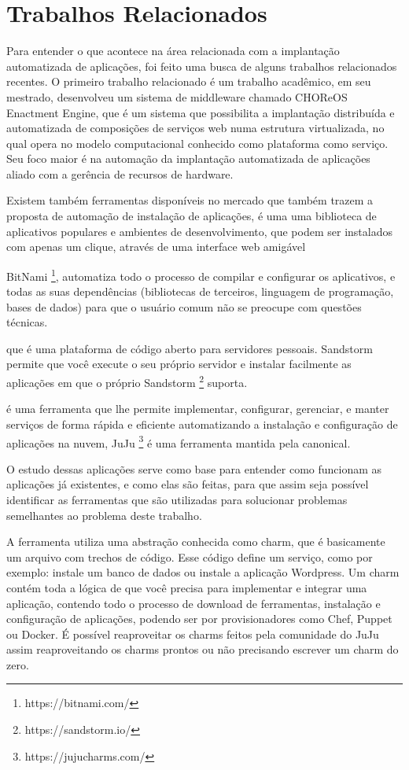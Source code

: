 \section{Trabalhos Relacionados}
\label{section:trabalhos_relacionados}

Para entender o que acontece na área relacionada com a implantação
automatizada de aplicações, foi feito uma busca de alguns trabalhos relacionados recentes. 
O primeiro
trabalho relacionado é um trabalho acadêmico,  em seu mestrado,
desenvolveu um sistema de middleware chamado CHOReOS Enactment Engine, que é um
sistema que possibilita a implantação distribuída e automatizada de composições
de serviços web numa estrutura virtualizada, no qual opera no modelo
computacional conhecido como plataforma como serviço. Seu foco maior é na automação da 
implantação automatizada de aplicações aliado com a gerência de recursos de 
hardware.

Existem também ferramentas disponíveis no mercado que também trazem a proposta
de automação de instalação de aplicações,  é uma 
uma biblioteca de aplicativos populares e ambientes de desenvolvimento, 
que podem ser instalados com apenas um clique, 
através de uma interface web amigável 

BitNami \footnote{https://bitnami.com/}, automatiza todo o processo de 
compilar e configurar os aplicativos, 
e todas as suas dependências (bibliotecas de terceiros, linguagem de programação, 
bases de dados) para que o usuário comum não se preocupe com questões técnicas. 

  que é uma plataforma de código aberto para servidores
pessoais. Sandstorm permite que você execute o seu próprio servidor e instalar
facilmente as aplicações em que o próprio Sandstorm \footnote{https://sandstorm.io/} 
suporta. 

\cite{juju} é uma ferramenta que lhe permite 
implementar, configurar, gerenciar, 
e manter serviços de forma rápida e eficiente automatizando a instalação e 
configuração de aplicações na nuvem, JuJu \footnote{https://jujucharms.com/} 
é uma ferramenta mantida pela canonical. 

O estudo dessas aplicações serve como base para entender como funcionam as aplicações
já existentes, e como elas são feitas, para que assim seja possível identificar
as ferramentas que são utilizadas para solucionar problemas semelhantes ao problema deste
trabalho. 

A ferramenta  utiliza uma abstração conhecida como charm,
que é basicamente um arquivo com trechos de código. Esse código define um serviço, 
como por exemplo: instale um banco de dados ou instale a aplicação Wordpress. Um charm
contém toda a lógica de que você precisa para implementar e integrar uma aplicação,
contendo todo o processo de download de ferramentas, instalação e configuração de
aplicações, podendo ser por provisionadores como Chef, Puppet ou Docker. 
É possível reaproveitar os charms feitos pela comunidade do JuJu assim
reaproveitando os charms prontos ou não precisando escrever um charm do zero.

